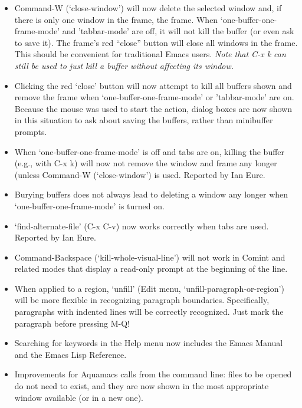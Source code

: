 \begin{itemize}
\item Command-W (`close-window') will now delete the selected window and, if there is only one window in the frame, the frame.  When `one-buffer-one-frame-mode' and 'tabbar-mode' are off, it will not kill the buffer (or even ask to save it).   The frame's red ``close'' button will close all windows in the frame.  This should be convenient for traditional Emacs users.  \emph{Note that C-x k can still be used to just kill a buffer without affecting its window.} 

\item Clicking the red `close' button will now attempt to kill all buffers shown and remove the frame when `one-buffer-one-frame-mode' or 'tabbar-mode' are on.   Because the mouse was used to start the action, dialog boxes are now shown in this situation to ask about saving the buffers, rather than minibuffer prompts. 

\item When `one-buffer-one-frame-mode' is off and tabs are on, killing the buffer (e.g., with C-x k) will now not remove the window and frame any longer (unless Command-W (`close-window') is used.  
Reported by Ian Eure.

\item Burying buffers does not always lead to deleting a window any longer when `one-buffer-one-frame-mode' is turned on.

\item `find-alternate-file' (C-x C-v) now works correctly when tabs are used.  Reported by Ian Eure.

\item Command-Backspace (`kill-whole-visual-line') will not work in Comint and related modes that display a read-only prompt at the beginning of the line.

\item When applied to a region, `unfill' (Edit menu, `unfill-paragraph-or-region') will be more flexible in recognizing paragraph boundaries.  Specifically, paragraphs with indented lines will be correctly recognized.  Just mark the paragraph before pressing M-Q!

\item Searching for keywords in the Help menu now includes the Emacs Manual and the Emacs Lisp Reference.

\item Improvements for Aquamacs calls from the command line: files to be opened do not need to exist, and they are now shown in the most appropriate window available (or in a new one).


\end{itemize}
